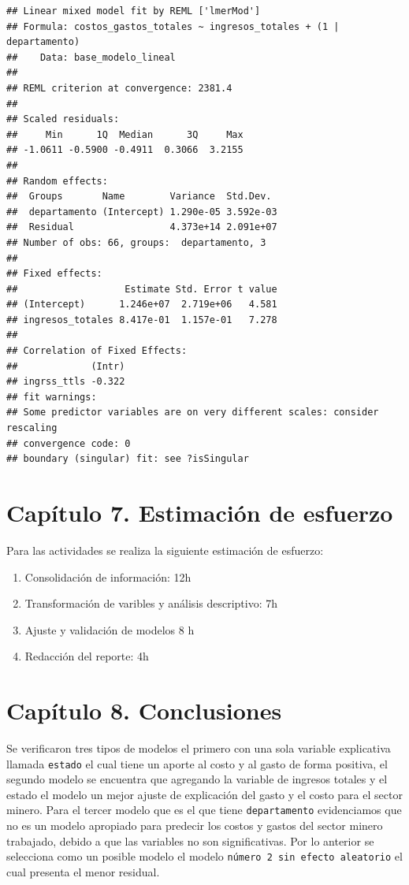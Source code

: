 \documentclass[
  11pt,
]{book}
\providecommand{\tightlist}{%
  \setlength{\itemsep}{0pt}\setlength{\parskip}{0pt}}
\begin{document}
\begin{verbatim}
## Linear mixed model fit by REML ['lmerMod']
## Formula: costos_gastos_totales ~ ingresos_totales + (1 | departamento)
##    Data: base_modelo_lineal
## 
## REML criterion at convergence: 2381.4
## 
## Scaled residuals: 
##     Min      1Q  Median      3Q     Max 
## -1.0611 -0.5900 -0.4911  0.3066  3.2155 
## 
## Random effects:
##  Groups       Name        Variance  Std.Dev. 
##  departamento (Intercept) 1.290e-05 3.592e-03
##  Residual                 4.373e+14 2.091e+07
## Number of obs: 66, groups:  departamento, 3
## 
## Fixed effects:
##                   Estimate Std. Error t value
## (Intercept)      1.246e+07  2.719e+06   4.581
## ingresos_totales 8.417e-01  1.157e-01   7.278
## 
## Correlation of Fixed Effects:
##             (Intr)
## ingrss_ttls -0.322
## fit warnings:
## Some predictor variables are on very different scales: consider rescaling
## convergence code: 0
## boundary (singular) fit: see ?isSingular
\end{verbatim}

\hypertarget{capuxedtulo-7.-estimaciuxf3n-de-esfuerzo}{%
\chapter{Capítulo 7. Estimación de
esfuerzo}\label{capuxedtulo-7.-estimaciuxf3n-de-esfuerzo}}

Para las actividades se realiza la siguiente estimación de esfuerzo:

\begin{enumerate}
\def\labelenumi{\arabic{enumi})}
\tightlist
\item
  Consolidación de información: 12h
\item
  Transformación de varibles y análisis descriptivo: 7h
\item
  Ajuste y validación de modelos 8 h
\item
  Redacción del reporte: 4h
\end{enumerate}

\hypertarget{capuxedtulo-8.-conclusiones}{%
\chapter{Capítulo 8. Conclusiones}\label{capuxedtulo-8.-conclusiones}}

Se verificaron tres tipos de modelos el primero con una sola variable
explicativa llamada \texttt{estado} el cual tiene un aporte al costo y
al gasto de forma positiva, el segundo modelo se encuentra que agregando
la variable de ingresos totales y el estado el modelo un mejor ajuste de
explicación del gasto y el costo para el sector minero. Para el tercer
modelo que es el que tiene \texttt{departamento} evidenciamos que no es
un modelo apropiado para predecir los costos y gastos del sector minero
trabajado, debido a que las variables no son significativas. Por lo
anterior se selecciona como un posible modelo el modelo
\texttt{número\ 2\ sin\ efecto\ aleatorio} el cual presenta el menor
residual.
\end{document}
